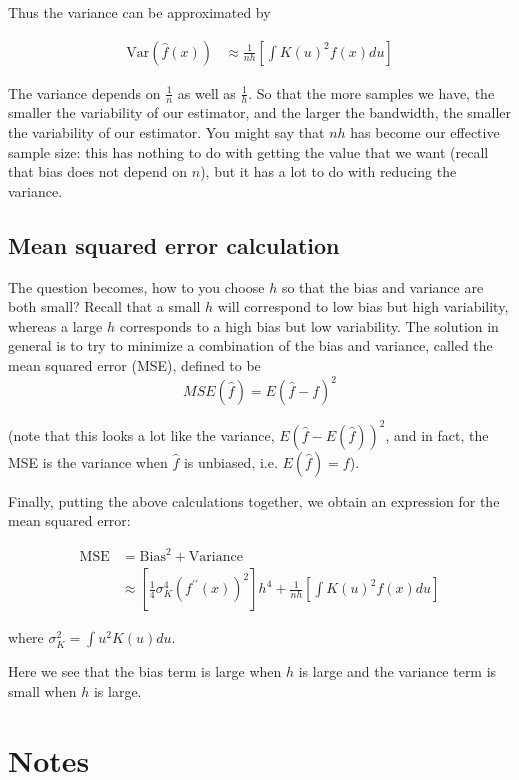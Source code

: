 Thus the variance can be approximated by



\begin{align*}
\text{Var}(\hat{f}(x)) &\approx \frac{1}{nh} \left[ \int K(u)^2 f(x) du \right] 
\end{align*}



The variance depends on $\frac{1}{n}$ as well as $\frac{1}{h}$. So that the more samples we have, the smaller the variability of our estimator, and the larger the bandwidth, the smaller the variability of our estimator. You might say that $nh$ has become our effective sample size: this has nothing to do with getting the value that we want (recall that bias does not depend on $n$), but it has a lot to do with reducing the variance.




\subsection*{Mean squared error calculation}

The question becomes, how to you choose $h$ so that the bias and variance are both small? Recall that a small $h$ will correspond to low bias but high variability, whereas a large $h$ corresponds to a high bias but low variability. The solution in general is to try to minimize a combination of the bias and variance, called the mean squared error (MSE), defined to be
$$MSE(\hat{f}) = E\left(\hat{f} - f\right)^2$$

(note that this looks a lot like the variance, $E\left(\hat{f} - E(\hat{f})\right)^2$, and in fact, the MSE is the variance when $\hat{f}$ is unbiased, i.e. $E(\hat{f}) = f$).

Finally, putting the above calculations together, we obtain an expression for the mean squared error:


\begin{align*}
\text{MSE} &= \text{Bias}^2 + \text{Variance} \\
& \approx \left[ \frac{1}{4} \sigma^4_K \left(f^{\prime \prime}(x)\right)^2\right] h^4 + \frac{1}{nh} \left[ \int K(u)^2 f(x) du \right] 
\end{align*}


where $\sigma^2_K = \int u^2K(u) du$.

Here we see that the bias term is large when $h$ is large and the variance term is small when $h$ is large.


\section{Notes}

